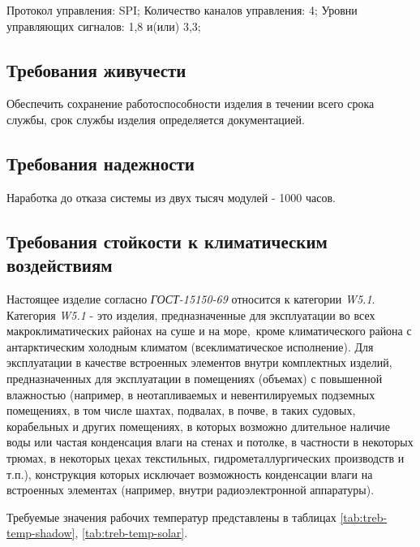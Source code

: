 \begin{longtable}{|p{4cm}|p{2cm}|p{2cm}|p{2cm}|p{2cm}|p{2cm}|}
\end{longtable}


Протокол управления: SPI; Количество каналов управления: 4; Уровни управляющих сигналов: 1,8 и(или) 3,3; 




\subsection{Требования живучести}

Обеспечить сохранение работоспособности изделия в течении всего срока службы, срок службы изделия определяется документацией.

\subsection{Требования надежности}

Наработка до отказа системы из двух тысяч модулей - 1000 часов.


\subsection{Требования стойкости к климатическим воздействиям}

Настоящее изделие согласно \textit{ГОСТ-15150-69} относится к категории \textit{W5.1}. Категория \textit{W5.1} - это изделия, предназначенные для эксплуатации во всех макроклиматических районах на суше и на море, кроме климатического района с антарктическим холодным климатом (всеклиматическое исполнение). Для эксплуатации в качестве встроенных элементов внутри комплектных изделий, предназначенных для эксплуатации в помещениях (объемах) с повышенной влажностью (например, в неотапливаемых и невентилируемых подземных помещениях, в том числе шахтах, подвалах, в почве, в таких судовых, корабельных и других помещениях, в которых возможно длительное наличие воды или частая конденсация влаги на стенах и потолке, в частности в некоторых трюмах, в некоторых цехах текстильных, гидрометаллургических производств и т.п.), конструкция которых исключает возможность конденсации влаги на встроенных элементах (например, внутри радиоэлектронной аппаратуры).\cite{GOST-1}


Требуемые значения рабочих температур представлены в таблицах \ref{tab:treb-temp-shadow}, \ref{tab:treb-temp-solar}.

